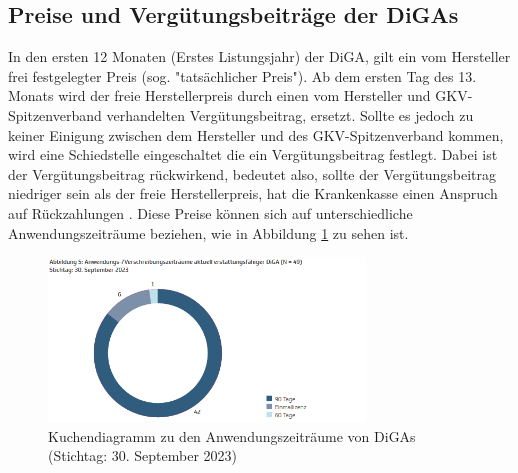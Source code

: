 \documentclass{article}
\begin{document}
		\subsection{Preise und Vergütungsbeiträge der DiGAs}  
			In den ersten 12 Monaten (Erstes Listungsjahr) der DiGA, gilt ein vom Hersteller frei festgelegter Preis (sog. "tatsächlicher Preis"). Ab dem ersten Tag des 13. Monats wird der freie Herstellerpreis durch einen vom Hersteller und GKV-Spitzenverband verhandelten Vergütungsbeitrag, ersetzt. Sollte es jedoch zu keiner Einigung zwischen dem Hersteller und des GKV-Spitzenverband kommen, wird eine Schiedstelle eingeschaltet die ein Vergütungsbeitrag festlegt. Dabei ist der Vergütungsbeitrag rückwirkend, bedeutet also, sollte der Vergütungsbeitrag niedriger sein als der freie Herstellerpreis, hat die Krankenkasse einen Anspruch auf Rückzahlungen \cite[vgl. S. 11]{TK-Report-2}. Diese Preise können sich auf unterschiedliche Anwendungszeiträume beziehen, wie in Abbildung \ref{Abb-andwendungszeiträume-diga} zu sehen ist. 
			\begin{figure}[hbtp]
				\centering
				\includegraphics[width=0.75\textwidth]{./grafiken/anwendungszeitraume_diga}
				\caption[Anwendungszeiträume von DiGAs]{Kuchendiagramm zu den Anwendungszeiträume von DiGAs (Stichtag: 30. September 2023)}
				\label{Abb-andwendungszeiträume-diga}
			\end{figure}
\end{document}
